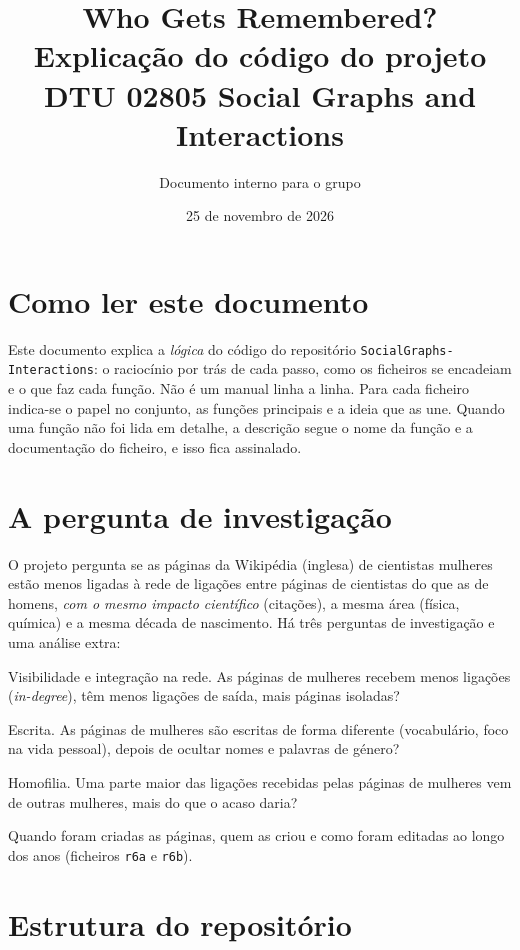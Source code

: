 \documentclass[11pt,a4paper]{article}
\title{\textbf{Who Gets Remembered?}\\[0.3em]
Explicação do código do projeto\\[0.3em]
\large DTU 02805 Social Graphs and Interactions}
\author{Documento interno para o grupo}
\date{25 de novembro de 2026}
\newcommand{\file}[1]{\texttt{#1}}
\begin{document}
\maketitle

\section*{Como ler este documento}

Este documento explica a \emph{lógica} do código do repositório \file{SocialGraphs-Interactions}: o raciocínio por trás de cada passo, como os ficheiros se encadeiam e o que faz cada função. Não é um manual linha a linha. Para cada ficheiro indica-se o papel no conjunto, as funções principais e a ideia que as une. Quando uma função não foi lida em detalhe, a descrição segue o nome da função e a documentação do ficheiro, e isso fica assinalado.

\section{A pergunta de investigação}

O projeto pergunta se as páginas da Wikipédia (inglesa) de cientistas mulheres estão menos ligadas à rede de ligações entre páginas de cientistas do que as de homens, \emph{com o mesmo impacto científico} (citações), a mesma área (física, química) e a mesma década de nascimento. Há três perguntas de investigação e uma análise extra:

\begin{description}[leftmargin=2.2cm,style=nextline]
  \item[RQ1] Visibilidade e integração na rede. As páginas de mulheres recebem menos ligações (\emph{in-degree}), têm menos ligações de saída, mais páginas isoladas?
  \item[RQ2] Escrita. As páginas de mulheres são escritas de forma diferente (vocabulário, foco na vida pessoal), depois de ocultar nomes e palavras de género?
  \item[RQ3] Homofilia. Uma parte maior das ligações recebidas pelas páginas de mulheres vem de outras mulheres, mais do que o acaso daria?
  \item[Extra: história] Quando foram criadas as páginas, quem as criou e como foram editadas ao longo dos anos (ficheiros \file{r6a} e \file{r6b}).
\end{description}

\section{Estrutura do repositório}
\end{document}
